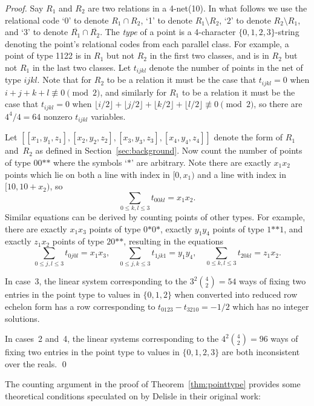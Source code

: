 \documentclass[runningheads]{llncs}
\begin{document}
\begin{proof}
Say $R_1$ and $R_2$ are two relations in a 4-net(10).
In what follows we use the relational code `0' to denote $R_1\cap R_2$, `1' to denote $R_1\setminus R_2$,
`2' to denote $R_2\setminus R_1$, and `3' to denote $\overline{R_1}\cap\overline{R_2}$.
The \emph{type} of a point is a 4-character $\{0,1,2,3\}$-string denoting the point's relational codes
from each parallel class.  For example, a point of type 1122 is in $R_1$ but not $R_2$ in the first
two classes, and is in $R_2$ but not $R_1$ in the last two classes.
Let $t_{ijkl}$ denote the number of points in the net of type $ijkl$.
Note that for $R_2$ to be a relation it must be the case that $t_{ijkl}=0$ when $i+j+k+l\not\equiv0\pmod{2}$,
and similarly for $R_1$ to be a relation it must be the case that $t_{ijkl}=0$ when
$\lfloor i/2\rfloor+\lfloor j/2\rfloor+\lfloor k/2\rfloor+\lfloor l/2\rfloor\not\equiv0\pmod{2}$,
so there are $4^4/4=64$ nonzero $t_{ijkl}$ variables.

Let $[[x_1,y_1,z_1],[x_2,y_2,z_2],[x_3,y_3,z_3],[x_4,y_4,z_4]]$ denote the form of $R_1$ and~$R_2$
as defined in Section~\ref{sec:background}.
Now count the number of points of type $00\mathord{*}\mathord{*}$ where the symbols `$*$' are arbitrary.
Note there are exactly $x_1x_2$ points which lie on both a line with index in $[0,x_1)$ and a line with index in $[10,10+x_2)$,
so
\begin{equation} \sum_{0\leq k,l\leq 3} t_{00kl} = x_1x_2 . \end{equation}
Similar equations can be derived by counting points of other types.
For example, there are exactly $x_1x_3$ points of type $0\mathord{*}0\mathord{*}$, exactly $y_1y_4$
points of type $1\mathord{*}\mathord{*}1$, and exactly $z_1x_2$ points of type $20\mathord{*}\mathord{*}$,
resulting in the equations
\begin{equation} \sum_{0\leq j,l\leq 3} t_{0j0l} = x_1x_3, \quad \sum_{0\leq j,k\leq 3} t_{1jk1} = y_1y_4, \quad \sum_{0\leq k,l\leq 3} t_{20kl} = z_1x_2 . \end{equation}

In case~3, the linear system corresponding to the $3^2\binom{4}{2}=54$ ways of fixing
two entries in the point type to values in $\{0,1,2\}$ when converted into reduced row echelon form
has a row corresponding to $t_{0123}-t_{3210}=-1/2$ which has
no integer solutions.

In cases~2 and~4, the linear systems corresponding to the $4^2\binom{4}{2}=96$ ways of fixing
two entries in the point type to values in $\{0,1,2,3\}$ are both inconsistent over the reals. \qed
\end{proof}
The counting argument in the proof of Theorem~\ref{thm:pointtype} provides some theoretical
conditions speculated on by Delisle in their original work:
\end{document}
